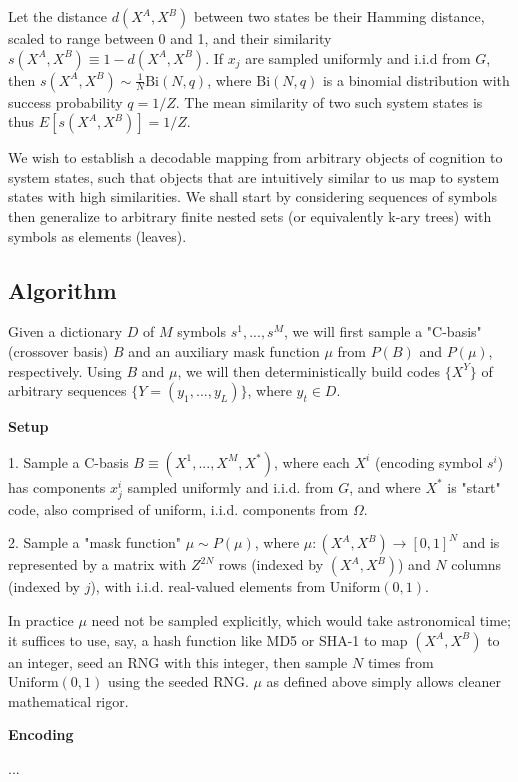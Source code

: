 \documentclass{article}
\begin{document}
Let the distance $d(X^A, X^B)$ between two states be their Hamming distance, scaled to range between 0 and 1, and their similarity $s(X^A, X^B) \equiv 1 - d(X^A, X^B)$. If $x_j$ are sampled uniformly and i.i.d from $G$, then $s(X^A, X^B) \sim \frac{1}{N} \textrm{Bi}(N, q)$, where $\textrm{Bi}(N, q)$ is a binomial distribution with success probability $q = 1/Z$. The mean similarity of two such system states is thus $E[s(X^A, X^B)] = 1/Z$.

We wish to establish a decodable mapping from arbitrary objects of cognition to system states, such that objects that are intuitively similar to us map to system states with high similarities. We shall start by considering sequences of symbols then generalize to arbitrary finite nested sets (or equivalently k-ary trees) with symbols as elements (leaves).

\subsection{Algorithm}

Given a dictionary $D$ of $M$ symbols $s^1, ..., s^M$, we will first sample a "C-basis" (crossover basis) $B$ and an auxiliary mask function $\mu$ from $P(B)$ and $P(\mu)$, respectively. Using $B$ and $\mu$, we will then deterministically build codes $\{X^Y\}$ of arbitrary sequences $\{Y = (y_1, ..., y_L)\}$, where $y_t \in D$.

\textbf{Setup}

1. Sample a C-basis $B \equiv (X^1, ..., X^M, X^*)$, where each $X^i$ (encoding symbol $s^i$) has components $x^i_j$ sampled uniformly and i.i.d. from $G$, and where $X^*$ is "start" code, also comprised of uniform, i.i.d. components from $\Omega$.

2. Sample a "mask function" $\mu \sim P(\mu)$, where $\mu:(X^A, X^B) \rightarrow [0, 1]^N$ and is represented by a matrix with $Z^{2N}$ rows (indexed by $(X^A, X^B)$) and $N$ columns (indexed by $j$), with i.i.d. real-valued elements from $\textrm{Uniform}(0, 1)$.

In practice $\mu$ need not be sampled explicitly, which would take astronomical time; it suffices to use, say, a hash function like MD5 or SHA-1 to map $(X^A, X^B)$ to an integer, seed an RNG with this integer, then sample $N$ times from $\textrm{Uniform}(0, 1)$ using the seeded RNG. $\mu$ as defined above simply allows cleaner mathematical rigor.

\textbf{Encoding}

...
\end{document}
